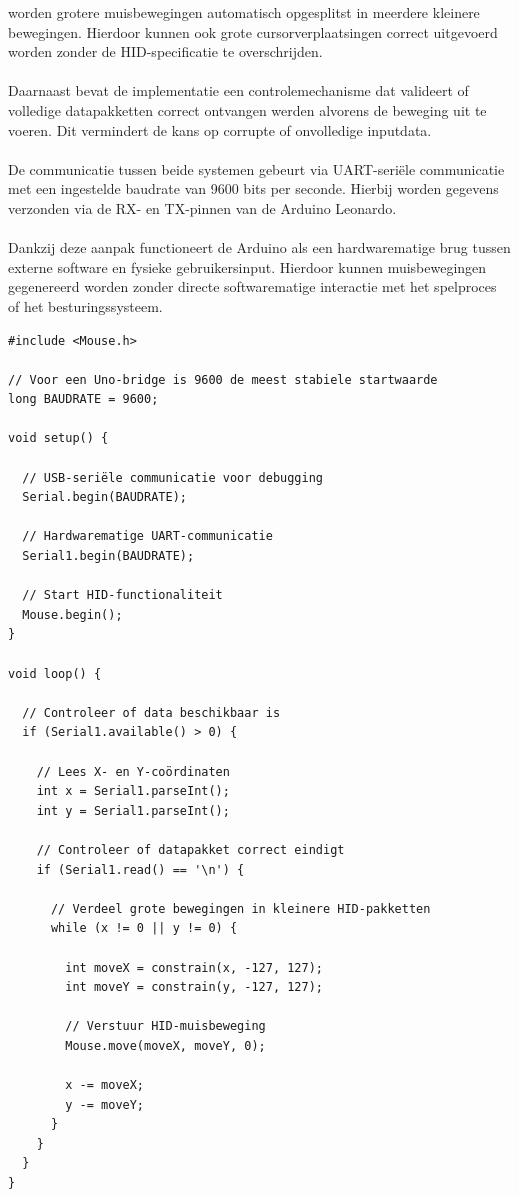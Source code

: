worden grotere muisbewegingen automatisch opgesplitst in meerdere kleinere bewegingen. Hierdoor kunnen ook grote cursorverplaatsingen correct uitgevoerd worden zonder de HID-specificatie te overschrijden.
\\\\
Daarnaast bevat de implementatie een controlemechanisme dat valideert of volledige datapakketten correct ontvangen werden alvorens de beweging uit te voeren. Dit vermindert de kans op corrupte of onvolledige inputdata.
\\\\
De communicatie tussen beide systemen gebeurt via UART-seriële communicatie met een ingestelde baudrate van 9600 bits per seconde. Hierbij worden gegevens verzonden via de RX- en TX-pinnen van de Arduino Leonardo.
\\\\
Dankzij deze aanpak functioneert de Arduino als een hardwarematige brug tussen externe software en fysieke gebruikersinput. Hierdoor kunnen muisbewegingen gegenereerd worden zonder directe softwarematige interactie met het spelproces of het besturingssysteem.

\begin{verbatim}
#include <Mouse.h>

// Voor een Uno-bridge is 9600 de meest stabiele startwaarde
long BAUDRATE = 9600; 

void setup() {

  // USB-seriële communicatie voor debugging
  Serial.begin(BAUDRATE); 
  
  // Hardwarematige UART-communicatie
  Serial1.begin(BAUDRATE); 
  
  // Start HID-functionaliteit
  Mouse.begin();
}

void loop() {

  // Controleer of data beschikbaar is
  if (Serial1.available() > 0) {
    
    // Lees X- en Y-coördinaten
    int x = Serial1.parseInt();
    int y = Serial1.parseInt();
    
    // Controleer of datapakket correct eindigt
    if (Serial1.read() == '\n') {

      // Verdeel grote bewegingen in kleinere HID-pakketten
      while (x != 0 || y != 0) {

        int moveX = constrain(x, -127, 127);
        int moveY = constrain(y, -127, 127);

        // Verstuur HID-muisbeweging
        Mouse.move(moveX, moveY, 0);

        x -= moveX;
        y -= moveY;
      }
    }
  }
}
\end{verbatim}
